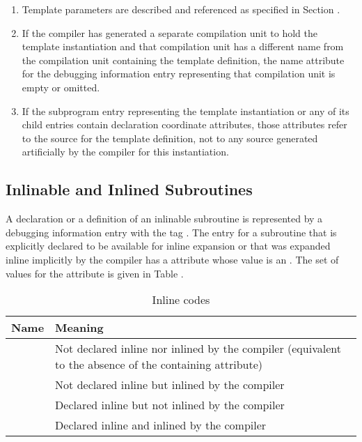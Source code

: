 \begin{enumerate}[1. ]
\item Template parameters are described and referenced as specified in
Section .

\item If the compiler has generated a separate compilation unit
to hold the template instantiation and that compilation unit
has a different name from the compilation unit containing
the template definition, the name attribute for the debugging
information entry representing that compilation unit is empty
or omitted.

\item If the subprogram entry representing the template
instantiation or any of its child entries contain declaration
coordinate attributes, those attributes refer to the source
for the template definition, not to any source generated
artificially by the compiler for this instantiation.
\end{enumerate}


\subsection{Inlinable and Inlined Subroutines}
\label{chap:inlinedsubroutines}
A declaration or a definition of an inlinable subroutine
is represented by a debugging information entry with the
tag \DWTAGsubprogram.
The entry for a subroutine 
that is\hypertarget{chap:DWATinlineinlinedsubroutine}{}
explicitly declared to be available for inline expansion or
that was expanded inline implicitly by the compiler has a
\DWATinlineDEFN{} attribute whose value is an 
. The
set of values for the \DWATinline{} attribute is given in
Table .

\begin{table}[ht]
\centering
\caption{Inline codes}
\label{tab:inlinecodes}
\begin{tabular}{l|P{8cm}}
\hline
Name&Meaning\\ \hline
\DWINLnotinlinedTARG{} & Not declared inline nor inlined by the
  \mbox{compiler} (equivalent to the absence of the
  containing \DWATinline{} attribute) \\
\DWINLinlinedTARG{} & Not declared inline but inlined by the \mbox{compiler} \\
\DWINLdeclarednotinlinedTARG{} & Declared inline but 
  not inlined by the \mbox{compiler} \\
\DWINLdeclaredinlinedTARG{} & Declared inline and inlined by the 
  \mbox{compiler} \\
\hline
\end{tabular}
\end{table}

